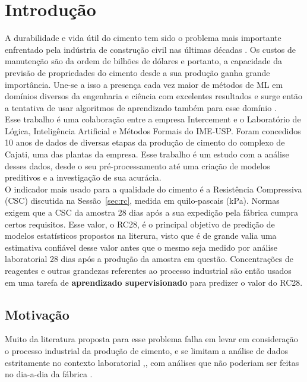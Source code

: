 \chapter{Introdução}
\label{cap:introducao}


A durabilidade e vida útil do cimento tem sido o problema mais importante enfrentado pela indústria de construção civil nas últimas décadas \citep{cementml}. Os custos de manutenção são da ordem de bilhões de dólares e portanto, a capacidade da previsão de propriedades do cimento desde a sua produção ganha grande importância. Une-se a isso a presença cada vez maior de métodos de ML em domínios diversos da engenharia e ciência com excelentes resultados e surge então a tentativa de usar algoritmos de aprendizado também para esse domínio \citep{cementnn1, cementnn2}. \\ 

Esse trabalho é uma colaboração entre a empresa Intercement e o Laboratório de
Lógica, Inteligência Artificial e Métodos Formais do IME-USP. Foram concedidos
10 anos de dados de diversas etapas da produção de cimento do complexo de
Cajati, uma das plantas da empresa. Esse trabalho é um estudo com a análise
desses dados, desde o seu pré-processamento até uma criação de modelos
preditivos e a investigação de sua acurácia. \\

O indicador mais usado para a qualidade do cimento é a Resistência Compressiva (CSC) discutida na Sessão~\ref{sec:rc}, medida em quilo-pascais (kPa). Normas exigem que a CSC da amostra 28 dias após a sua expedição pela fábrica
cumpra certos requisitos. Esse valor, o RC28, é o principal objetivo de predição de modelos estatísticos propostos na literura, visto que é de grande valia uma estimativa confiável desse valor antes que o mesmo seja medido por análise laboratorial 28 dias após a produção da amostra em questão. Concentrações de reagentes e outras grandezas referentes ao processo industrial são então usados em uma tarefa de \textbf{aprendizado supervisionado} para predizer o valor do RC28. \\


\section {Motivação}


Muito da literatura proposta para esse problema falha em levar em consideração o processo industrial da produção de cimento, e se limitam a análise de dados estritamente no contexto laboratorial \citep{cementlin},\citep{nncement}, com análises que não poderiam ser feitas no dia-a-dia da fábrica \citep{dynstat}. \\

